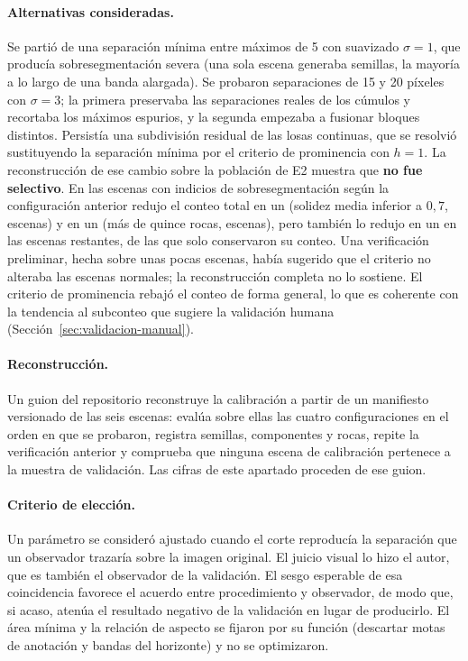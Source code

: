 \paragraph{Alternativas consideradas.} Se partió de una separación mínima entre máximos de
\SI{5}{\px} con suavizado $\sigma = 1$, que producía sobresegmentación severa (una sola escena
generaba \cCalSemillasA{} semillas, la mayoría a lo largo de una banda alargada). Se probaron separaciones de \num{15} y
\num{20} píxeles con $\sigma = 3$; la primera preservaba las separaciones reales de los cúmulos
y recortaba los máximos espurios, y la segunda empezaba a fusionar bloques distintos. Persistía
una subdivisión residual de las losas continuas, que se resolvió sustituyendo la separación
mínima por el criterio de prominencia con $h = 1$. La reconstrucción de ese cambio sobre la
población de E2 muestra que \textbf{no fue selectivo}. En las escenas con indicios de
sobresegmentación según la configuración anterior redujo el conteo total en un \cCalRedBaja{}
(solidez media inferior a $0{,}7$, \cCalNBaja{} escenas) y en un \cCalRedMuchas{} (más de quince
rocas, \cCalNMuchas{} escenas), pero también lo redujo en un \cCalRedNorm{} en las \cCalNormN{}
escenas restantes, de las que solo \cCalNormSinCambio{} conservaron su conteo. Una verificación
preliminar, hecha sobre unas pocas escenas, había sugerido que el criterio no alteraba las
escenas normales; la reconstrucción completa no lo sostiene. El criterio de prominencia rebajó el
conteo de forma general, lo que es coherente con la tendencia al subconteo que sugiere la
validación humana
(Sección~\ref{sec:validacion-manual}).

\paragraph{Reconstrucción.} Un guion del repositorio reconstruye la calibración a partir de un
manifiesto versionado de las seis escenas: evalúa sobre ellas las cuatro configuraciones en el
orden en que se probaron, registra semillas, componentes y rocas, repite la verificación anterior
y comprueba que ninguna escena de calibración pertenece a la muestra de validación. Las cifras de
este apartado proceden de ese guion.

\paragraph{Criterio de elección.} Un parámetro se consideró ajustado cuando el corte reproducía
la separación que un observador trazaría sobre la imagen original. El juicio visual lo hizo el
autor, que es también el observador de la validación. El sesgo esperable de esa coincidencia
favorece el acuerdo entre procedimiento y observador, de modo que, si acaso, atenúa el
resultado negativo de la validación en lugar de producirlo. El área mínima y la relación
de aspecto se fijaron por su función (descartar motas de anotación y bandas del horizonte) y no
se optimizaron.

